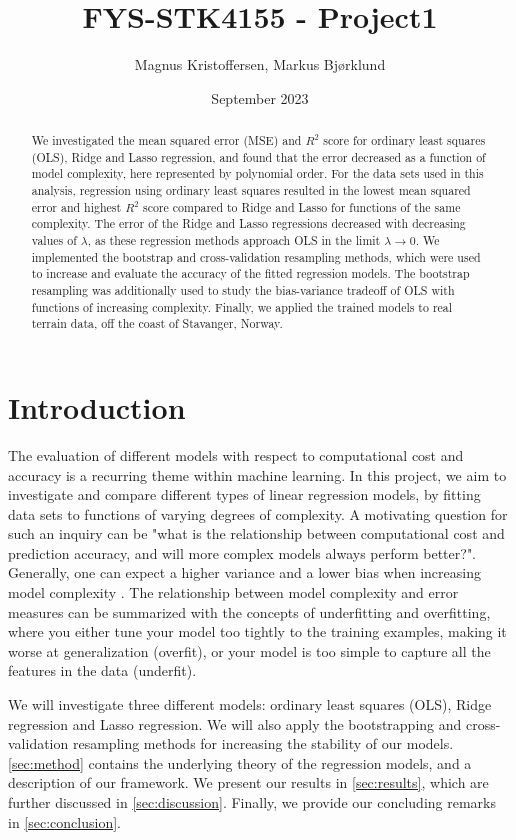 \documentclass[12pt]{article}
\title{FYS-STK4155 - Project1}
\author{Magnus Kristoffersen, Markus Bjørklund}
\date{September 2023}
\begin{document}
\maketitle

\begin{abstract}
    We investigated the mean squared error (MSE) and $R^2$ score for ordinary least squares (OLS), Ridge and Lasso regression, and found that the error decreased as a function of model complexity, here represented by polynomial order. For the data sets used in this analysis, regression using ordinary least squares resulted in the lowest mean squared error and highest $R^2$ score compared to Ridge and Lasso for functions of the same complexity. The error of the Ridge and Lasso regressions decreased with decreasing values of $\lambda$, as these regression methods approach OLS in the limit $\lambda \rightarrow 0$. We implemented the bootstrap and cross-validation resampling methods, which were used to increase and evaluate the accuracy of the fitted regression models. The bootstrap resampling was additionally used to study the bias-variance tradeoff of OLS with functions of increasing complexity. Finally, we applied the trained models to real terrain data, off the coast of Stavanger, Norway.
\end{abstract}

\section{Introduction}
The evaluation of different models with respect to computational cost and accuracy is a recurring theme within machine learning. In this project, we aim to investigate and compare different types of linear regression models, 
by fitting data sets to functions of varying degrees of complexity. A motivating question for such an inquiry can be "what is the relationship between computational cost and prediction accuracy, and will more complex models always perform better?". Generally, one can expect a higher variance and a lower bias when increasing model complexity \cite{Hastie2009}. The relationship between model complexity and error measures can be summarized with the concepts of underfitting and overfitting, where you either tune your model too tightly to the training examples, making it worse at generalization (overfit), or your model is too simple to capture all the features in the data (underfit).

We will investigate three different models: ordinary least squares (OLS), Ridge regression and Lasso regression. We will also apply the bootstrapping and cross-validation resampling methods for increasing the stability of our models. \autoref{sec:method} contains the underlying theory of the regression models, and a description of our framework. We present our results in \autoref{sec:results}, which are further discussed in \autoref{sec:discussion}. Finally, we provide our concluding remarks in \autoref{sec:conclusion}.
\end{document}
